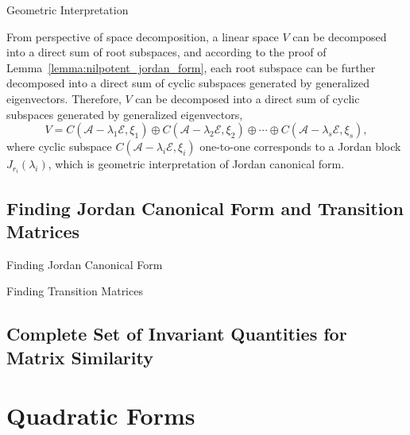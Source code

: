\documentclass[11pt]{../../TexTemplate/elegantbook} %
\begin{document}
\begin{leftbarTitle}{Geometric Interpretation}\end{leftbarTitle} %
From perspective of space decomposition, a linear space \( V \) can be decomposed into a direct sum of root subspaces,
and according to the proof of Lemma~\ref{lemma:nilpotent_jordan_form},
each root subspace can be further decomposed into a direct sum of cyclic subspaces generated by generalized eigenvectors.
Therefore, \(V\) can be decomposed into a direct sum of cyclic subspaces generated by generalized eigenvectors,
\[
V = C(\mathcal{A}-\lambda_{1}\mathcal{E}, \xi_{1}) \oplus C(\mathcal{A}-\lambda_{2}\mathcal{E}, \xi_{2}) \oplus \cdots \oplus 
C(\mathcal{A}-\lambda_{s}\mathcal{E}, \xi_{s}),
\]
where cyclic subspace \( C(\mathcal{A}-\lambda_{i}\mathcal{E}, \xi_{i}) \) one-to-one corresponds to 
a Jordan block \( J_{r_{i}}(\lambda_{i}) \), which is geometric interpretation of Jordan canonical form.


\section{Finding Jordan Canonical Form and Transition Matrices}
\begin{leftbarTitle}{Finding Jordan Canonical Form}\end{leftbarTitle}


\begin{leftbarTitle}{Finding Transition Matrices}\end{leftbarTitle}

\section{Complete Set of Invariant Quantities for Matrix Similarity}



\chapter{Quadratic Forms}
\end{document}

